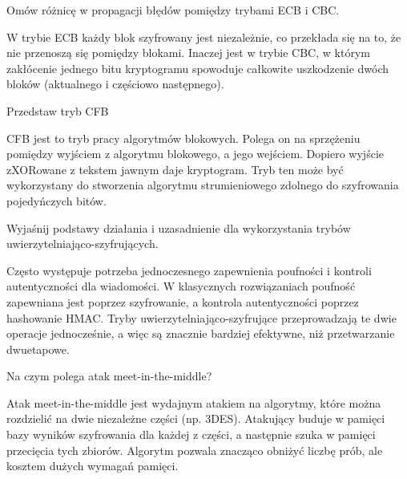 \documentclass[answers,11pt]{exam}
\begin{document}
\begin{questions}
\question Omów różnicę w propagacji błędów pomiędzy trybami ECB i CBC.
\begin{solution}
W trybie ECB każdy blok szyfrowany jest niezależnie, co przekłada się na to, że nie przenoszą się pomiędzy blokami. Inaczej jest w trybie CBC, w którym zakłócenie jednego bitu kryptogramu spowoduje całkowite uszkodzenie dwóch bloków (aktualnego i częściowo następnego). 
\end{solution}

\question Przedstaw tryb CFB
\begin{solution}
CFB jest to tryb pracy algorytmów blokowych. Polega on na sprzężeniu pomiędzy wyjściem z algorytmu blokowego, a jego wejściem. Dopiero wyjście zXORowane z tekstem jawnym daje kryptogram.
Tryb ten może być wykorzystany do stworzenia algorytmu strumieniowego zdolnego do szyfrowania pojedyńczych bitów. 
\end{solution}

\question Wyjaśnij podstawy działania i uzasadnienie dla wykorzystania trybów uwierzytelniająco-szyfrujących.
\begin{solution}
Często występuje potrzeba jednoczesnego zapewnienia poufności i kontroli autentyczności dla wiadomości. W klasycznych rozwiązaniach poufność zapewniana jest poprzez szyfrowanie, a kontrola autentyczności poprzez hashowanie HMAC. Tryby uwierzytelniająco-szyfrujące przeprowadzają te dwie operacje jednocześnie, a więc są znacznie bardziej efektywne, niż przetwarzanie dwuetapowe.
\end{solution}


\question Na czym polega atak meet-in-the-middle?
\begin{solution}
Atak meet-in-the-middle jest wydajnym atakiem na algorytmy, które można rozdzielić na dwie niezależne części (np. 3DES). Atakujący buduje w pamięci bazy wyników szyfrowania dla każdej z części, a następnie szuka w pamięci przecięcia tych zbiorów. Algorytm pozwala znacząco obniżyć liczbę prób, ale kosztem dużych wymagań pamięci.
\end{solution}


\end{questions}
\end{document}
